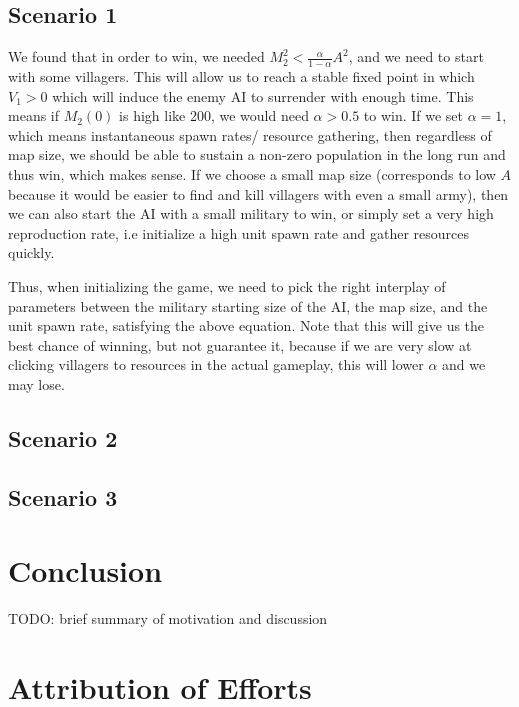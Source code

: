 \documentclass[12pt]{article}
\begin{document}
\subsection{Scenario 1}
We found that in order to win, we needed $M_2^2 < \frac{\alpha}{1 - \alpha} A^2$, and we need to start with some villagers. This will allow us to reach a stable fixed point in which $V_1 > 0$ which will induce the enemy AI to surrender with enough time. This means if $M_2(0)$ is high like 200, we would need $\alpha > 0.5$ to win. If we set $\alpha = 1$, which means instantaneous spawn rates/ resource gathering, then regardless of map size, we should be able to sustain a non-zero population in the long run and thus win, which makes sense. If we choose a small map size (corresponds to low $A$ because it would be easier to find and kill villagers with even a small army), then we can also start the AI with a small military to win, or simply set a very high reproduction rate, i.e initialize a high unit spawn rate and gather resources quickly. \par

Thus, when initializing the game, we need to pick the right interplay of parameters between the military starting size of the AI, the map size, and the unit spawn rate, satisfying the above equation. Note that this will give us the best chance of winning, but not guarantee it, because if we are very slow at clicking villagers to resources in the actual gameplay, this will lower $\alpha$ and we may lose.

\subsection{Scenario 2}
\subsection{Scenario 3}

\section{Conclusion} 
TODO: brief summary of motivation and discussion

\section{Attribution of Efforts} 
\paragraph{}
\end{document}

